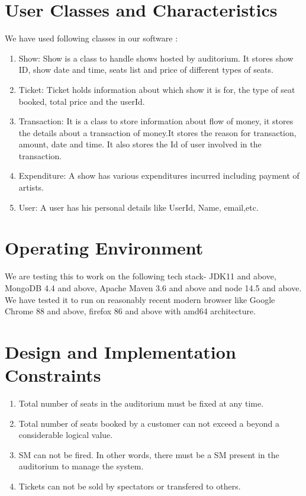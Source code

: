 \documentclass{scrreprt}
\begin{document}
\section{User Classes and Characteristics}
We have used following classes in our software :
\begin{enumerate}
	\item Show: Show is a class to handle shows hosted by auditorium. It stores show ID, show date and time, seats list and price of different types of seats.
	\item Ticket: Ticket holds information about which show it is for, the type of seat booked, total price and the userId.
	\item Transaction: It is a class to store information about flow of money, it stores the details about a transaction of money.It stores the reason for transaction, amount, date and time. It also stores the Id of user involved in the transaction.
	\item Expenditure: A show has various expenditures incurred including payment of artists.
	\item User: A user has his personal details like UserId, Name, email,etc.
\end{enumerate}


\section{Operating Environment}

We are testing this to work on the following tech stack- JDK11 and above, MongoDB 4.4 and above, Apache Maven 3.6 and above and node 14.5 and above. We have tested it to run on reasonably recent modern browser like Google Chrome 88 and above, firefox 86 and above with amd64 architecture.

\section{Design and Implementation Constraints}

\begin{enumerate}
	\item Total number of seats in the auditorium must be fixed at any time.
	
	\item  Total number of seats booked by a customer can not exceed a beyond a considerable logical value.
	
	\item SM can not be fired. In other words, there must be a SM present in the auditorium to manage the system.
	
	\item Tickets can not be sold by spectators or transfered to others.
	
\end{enumerate}
\end{document}
